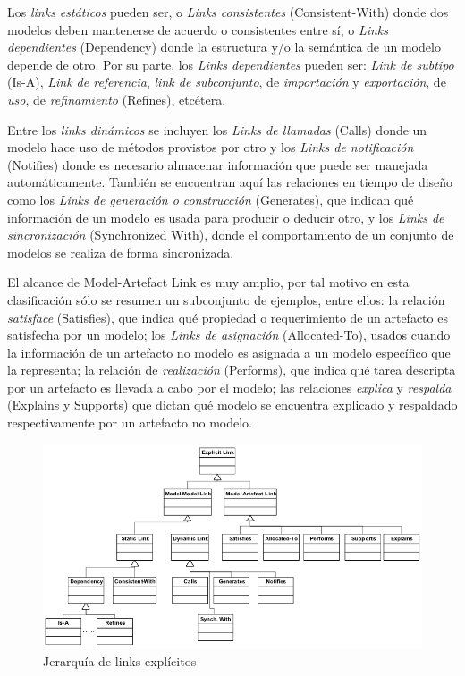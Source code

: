 \documentclass[a4paper,12pt,oneside,spanish]{book}
\begin{document}
Los \textit{links estáticos} pueden ser, o \textit{Links consistentes} (\textsf{Consistent-With}) donde dos modelos deben mantenerse de acuerdo o consistentes entre sí, o \textit{Links dependientes} (\textsf{Dependency}) donde la estructura y/o la semántica de un modelo depende de otro. Por su parte, los \textit{Links dependientes} pueden ser: \textit{Link de subtipo} (\textsf{Is-A}), \textit{Link de referencia}, \textit{link de subconjunto}, de \textit{importación} y \textit{exportación}, de \textit{uso}, de \textit{refinamiento} (\textsf{Refines}), etcétera.

Entre los \textit{links dinámicos} se incluyen los \textit{Links de llamadas} (\textsf{Calls}) donde un modelo hace uso de métodos provistos por otro y los \textit{Links de notificación} (\textsf{Notifies}) donde es necesario almacenar información que puede ser manejada automáticamente. También se encuentran aquí las relaciones en tiempo de diseño como los \textit{Links de generación o construcción} (\textsf{Generates}), que indican qué información de un modelo es usada para producir o deducir otro, y los \textit{Links de sincronización} (\textsf{Synchronized With}), donde el comportamiento de un conjunto de modelos se realiza de forma sincronizada.

El alcance de \textsf{Model-Artefact Link} es muy amplio, por tal motivo en esta clasificación sólo se resumen un subconjunto de ejemplos, entre ellos: la relación \textit{satisface} (\textsf{Satisfies}), que indica qué propiedad o requerimiento de un artefacto es satisfecha por un modelo; los \textit{Links de asignación} (\textsf{Allocated-To}), usados cuando la información de un artefacto no modelo es asignada a un modelo específico que la representa; la relación de \textit{realización} (\textsf{Performs}), que indica qué tarea descripta por un artefacto es llevada a cabo por el modelo; las relaciones \textit{explica} y \textit{respalda} (\textsf{Explains} y \textsf{Supports}) que dictan qué modelo se encuentra explicado y respaldado respectivamente por un artefacto no modelo.

\begin{figure}[hbtp]
\centering
\includegraphics[scale=0.52]{./img/ExplicitTraceLinks}
\caption{Jerarquía de links explícitos}
\label{fig:LinksExplicitos}
\end{figure}
\end{document}
